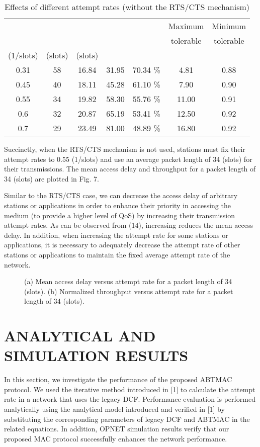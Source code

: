 \documentclass[10pt,twocolumn,oneside,submit]{JCNtran}
\begin{document}
\begin{table*}
\caption{Effects of different attempt rates (without the RTS/CTS mechanism)}
\label{tab:tab3}
\begin{center}
{\small \begin{tabular}{|c|c|c|c|c|c|c|}\hline
 &  &  &  &   &  Maximum &  Minimum \\
 &  &  &  &  &  tolerable &  tolerable \\
 (1/slots) & (slots) & (slots) & & &  &  \\ \hline
0.31 & 58 & 16.84 & 31.95 & 70.34 \% & 4.81 & 0.88 \\
0.45 & 40 & 18.11 & 45.28 & 61.10 \% & 7.90 & 0.90 \\
0.55 & 34 & 19.82 & 58.30 & 55.76 \% & 11.00 & 0.91 \\
0.6 & 32 & 20.87 & 65.19 & 53.41 \% & 12.50 & 0.92 \\
0.7 & 29 & 23.49 & 81.00 & 48.89 \% & 16.80 & 0.92 \\ \hline
\end{tabular}}
\end{center}
\end{table*}
\par Succinctly, when the RTS/CTS mechanism is not used, stations must fix their attempt rates to 0.55 (1/slots) and use an average packet length of 34 (slots) for their transmissions. The mean access delay and throughput for a packet length of 34 (slots) are plotted in Fig. 7.
\par Similar to the RTS/CTS case, we can decrease the access delay of arbitrary stations or applications in order to enhance their priority in accessing the medium (to provide a higher level of QoS) by increasing their transmission attempt rates. As can be observed from (14), increasing  reduces the mean access delay. In addition, when increasing the attempt rate for some stations or applications, it is necessary to adequately decrease the attempt rate of other stations or applications to maintain the fixed average attempt rate of the network.  
\begin{figure*}[!t]
\begin{center}
\epsfxsize=16cm \leavevmode{} \caption{(a) Mean access delay versus attempt rate for a packet length of 34 (slots). (b) Normalized throughput versus attempt rate for a packet length of 34 (slots).} \label{fig:7}
\end{center}
\end{figure*}
\vspace{10pt}
\section{\uppercase{ANALYTICAL AND SIMULATION RESULTS}}
\label{sec:result}
\par In this section, we investigate the performance of the proposed ABTMAC protocol. We used the iterative method introduced in [1] to calculate the attempt rate in a network that uses the legacy DCF. Performance evaluation is performed analytically using the analytical model introduced and verified in [1] by substituting the corresponding parameters of legacy DCF and ABTMAC in the related equations. In addition, OPNET simulation results verify that our proposed MAC protocol successfully enhances the network performance.
\end{document}
